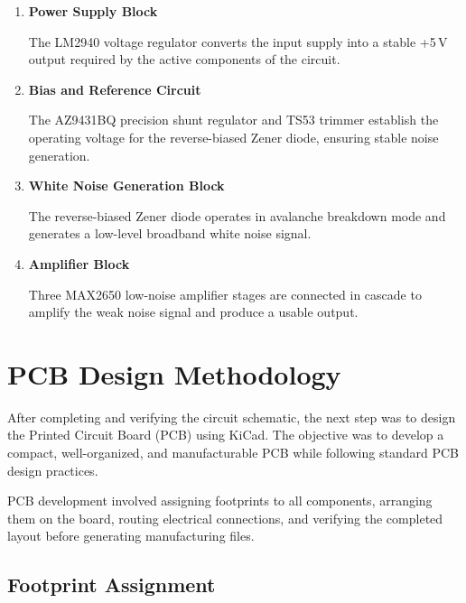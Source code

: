 \begin{enumerate}

\item \textbf{Power Supply Block}

The LM2940 voltage regulator converts the input supply into a stable +5\,V output required by the active components of the circuit.

\item \textbf{Bias and Reference Circuit}

The AZ9431BQ precision shunt regulator and TS53 trimmer establish the operating voltage for the reverse-biased Zener diode, ensuring stable noise generation.

\item \textbf{White Noise Generation Block}

The reverse-biased Zener diode operates in avalanche breakdown mode and generates a low-level broadband white noise signal.

\item \textbf{Amplifier Block}

Three MAX2650 low-noise amplifier stages are connected in cascade to amplify the weak noise signal and produce a usable output.

\end{enumerate}


\section{PCB Design Methodology}

After completing and verifying the circuit schematic, the next step was to design the Printed Circuit Board (PCB) using KiCad. The objective was to develop a compact, well-organized, and manufacturable PCB while following standard PCB design practices.

PCB development involved assigning footprints to all components, arranging them on the board, routing electrical connections, and verifying the completed layout before generating manufacturing files.


\subsection{Footprint Assignment}

